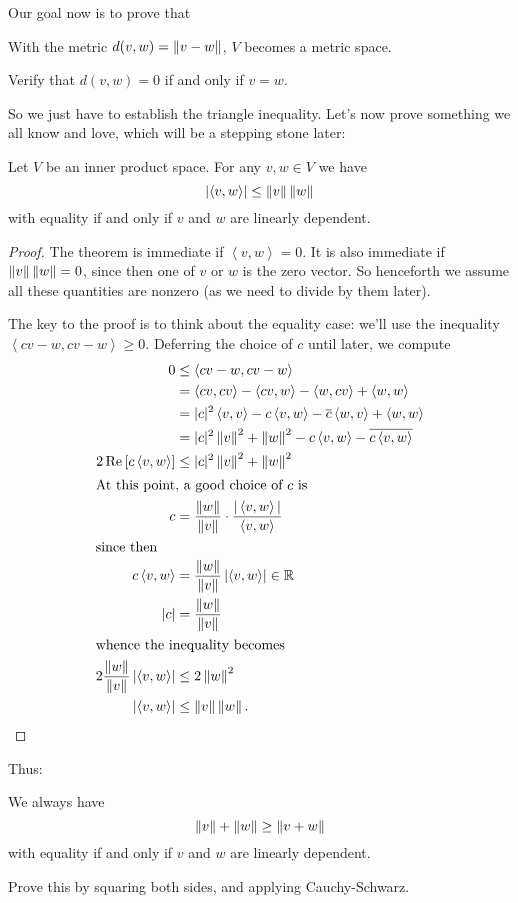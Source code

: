 Our goal now is to prove that
\begin{moral}
	With the metric $d(v,w) = \left\lVert v-w \right\rVert$, $V$ becomes a metric space.
\end{moral}
\begin{ques}
	Verify that $d(v,w) = 0$ if and only if $v = w$.
\end{ques}
So we just have to establish the triangle inequality.
Let's now prove something we all know and love,
which will be a stepping stone later:
\begin{lemma}
	Let $V$ be an inner product space.
	For any $v,w \in V$ we have
	\[ \left\lvert \left< v,w\right> \right\rvert
	\le \left\lVert v \right\rVert \left\lVert w \right\rVert \]
	with equality if and only if $v$ and $w$ are linearly dependent.
\end{lemma}
\begin{proof}
	The theorem is immediate if $\left< v,w\right> = 0$.
	It is also immediate if $\left\lVert v \right\rVert \left\lVert w \right\rVert = 0$,
	since then one of $v$ or $w$ is the zero vector.
	So henceforth we assume all these quantities are nonzero
	(as we need to divide by them later).

	The key to the proof is to think about the equality case:
	we'll use the inequality $\left< cv-w, cv-w\right> \ge 0$.
	Deferring the choice of $c$ until later, we compute
	\begin{align*}
		0 &\le \left< cv-w, cv-w \right> \\
		&= \left< cv, cv\right> - \left< cv, w\right> - \left< w, cv\right> + \left< w,w \right> \\
		&= |c|^2 \left< v,v \right> - c \left< v,w \right> - \overline c \left< w,v \right> + \left< w,w \right> \\
		&= |c|^2 \left\lVert v \right\rVert^2 + \left\lVert w \right\rVert^2 - c \left< v,w \right> - \overline{c \left< v,w\right> } \\
		2 \operatorname{Re} \left[ c \left< v,w \right> \right] &\le |c|^2 \left\lVert v \right\rVert^2 + \left\lVert w \right\rVert^2  \\
		\intertext{At this point, a good choice of $c$ is}
		c &= \frac{ \left\lVert w \right\rVert}{\left\lVert v \right\rVert} \cdot \frac{|\left< v,w\right>|}{\left< v,w\right>} \\
		\intertext{since then}
		c \left< v,w \right> &= \frac{\left\lVert w \right\rVert}{\left\lVert v \right\rVert} \left\lvert \left< v,w\right> \right\rvert \in \mathbb R \\
		|c| &= \frac{\left\lVert w \right\rVert}{\left\lVert v \right\rVert} \\
		\intertext{whence the inequality becomes}
		 2\frac{\left\lVert w \right\rVert}{\left\lVert v \right\rVert} \left\lvert \left< v,w\right> \right\rvert &\le 2 \left\lVert w \right\rVert^2  \\
		 \left\lvert \left< v,w\right> \right\rvert &\le \left\lVert v \right\rVert \left\lVert w \right\rVert. \qedhere
	\end{align*}
\end{proof}
Thus:
\begin{theorem}
	We always have
	\[ \left\lVert v \right\rVert + \left\lVert w \right\rVert \ge \left\lVert v+w \right\rVert \]
	with equality if and only if $v$ and $w$ are linearly dependent.
\end{theorem}
\begin{exercise}
	Prove this by squaring both sides, and applying Cauchy-Schwarz.
\end{exercise}


